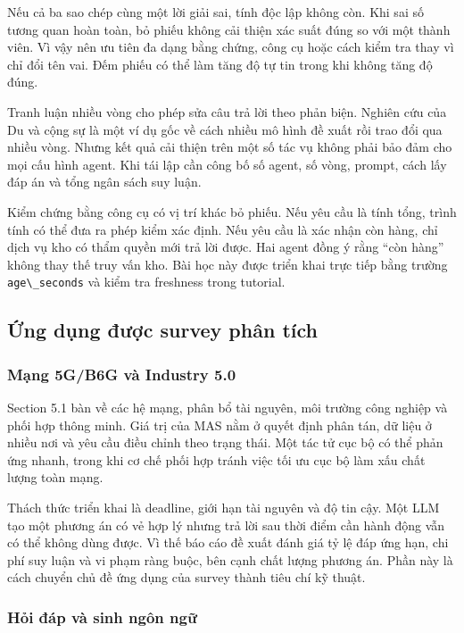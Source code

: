 Nếu cả ba sao chép cùng một lời giải sai, tính độc lập không còn. Khi
sai số tương quan hoàn toàn, bỏ phiếu không cải thiện xác suất đúng so
với một thành viên. Vì vậy nên ưu tiên đa dạng bằng chứng, công cụ hoặc
cách kiểm tra thay vì chỉ đổi tên vai. Đếm phiếu có thể làm tăng độ tự
tin trong khi không tăng độ đúng.

Tranh luận nhiều vòng cho phép sửa câu trả lời theo phản biện. Nghiên
cứu của Du và cộng sự là một ví dụ gốc về cách nhiều mô hình đề xuất rồi
trao đổi qua nhiều vòng. Nhưng kết quả cải thiện trên một số tác vụ
không phải bảo đảm cho mọi cấu hình agent. Khi tái lập cần công bố số
agent, số vòng, prompt, cách lấy đáp án và tổng ngân sách suy luận.
\cite{debate}

Kiểm chứng bằng công cụ có vị trí khác bỏ phiếu. Nếu yêu cầu là tính
tổng, trình tính có thể đưa ra phép kiểm xác định. Nếu yêu cầu là xác
nhận còn hàng, chỉ dịch vụ kho có thẩm quyền mới trả lời được. Hai agent
đồng ý rằng ``còn hàng'' không thay thế truy vấn kho. Bài học này được
triển khai trực tiếp bằng trường \passthrough{\lstinline!age\_seconds!}
và kiểm tra freshness trong tutorial.

\subsection{Ứng dụng được survey phân
tích}\label{ux1ee9ng-dux1ee5ng-ux111ux1b0ux1ee3c-survey-phuxe2n-tuxedch}

\subsubsection{Mạng 5G/B6G và Industry
5.0}\label{mux1ea1ng-5gb6g-vuxe0-industry-5.0}

Section 5.1 bàn về các hệ mạng, phân bổ tài nguyên, môi trường công
nghiệp và phối hợp thông minh. Giá trị của MAS nằm ở quyết định phân
tán, dữ liệu ở nhiều nơi và yêu cầu điều chỉnh theo trạng thái. Một tác
tử cục bộ có thể phản ứng nhanh, trong khi cơ chế phối hợp tránh việc
tối ưu cục bộ làm xấu chất lượng toàn mạng.

Thách thức triển khai là deadline, giới hạn tài nguyên và độ tin cậy.
Một LLM tạo một phương án có vẻ hợp lý nhưng trả lời sau thời điểm cần
hành động vẫn có thể không dùng được. Vì thế báo cáo đề xuất đánh giá tỷ
lệ đáp ứng hạn, chi phí suy luận và vi phạm ràng buộc, bên cạnh chất
lượng phương án. Phần này là cách chuyển chủ đề ứng dụng của survey
thành tiêu chí kỹ thuật.

\subsubsection{Hỏi đáp và sinh ngôn
ngữ}\label{hux1ecfi-ux111uxe1p-vuxe0-sinh-nguxf4n-ngux1eef}

